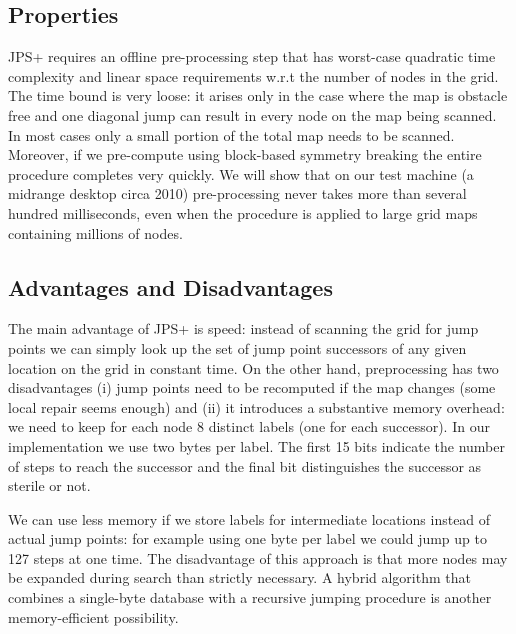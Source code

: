 \subsection*{Properties}
JPS+ requires an offline pre-processing step that has worst-case quadratic 
time complexity and linear space requirements w.r.t the number of nodes in 
the grid. The time bound is very loose: it arises only in the case 
where the map is obstacle free and one diagonal jump can result in
every node on the map being scanned. In most cases only a small portion
of the total map needs to be scanned. Moreover, if we pre-compute using block-based 
symmetry breaking the entire procedure completes very quickly.
We will show that on our test machine (a midrange desktop
circa 2010) pre-processing never takes more than several hundred milliseconds,
even when the procedure is applied to large grid maps containing millions
of nodes.
\subsection*{Advantages and Disadvantages}
The main advantage of JPS+ is speed: instead of scanning the grid for jump
points we can simply look up the set of jump point successors of any given
location on the grid in constant time.  On the other hand, preprocessing has
two disadvantages (i) jump points need to be recomputed if the map changes
(some local repair seems enough) and (ii) it introduces a substantive memory
overhead: we need to keep for each node 8 distinct labels (one for each
successor).  In our implementation we use two bytes per label. The first 15
bits indicate the number of steps to reach the successor and the final bit
distinguishes the successor as sterile or not.
\par
We can use less memory if we store labels for intermediate locations instead
of actual jump points: for example using one byte per label we could jump up
to 127 steps at one time. The disadvantage of this approach is that more nodes
may be expanded during search than strictly necessary. A hybrid algorithm that
combines a single-byte database with a recursive jumping procedure is another
memory-efficient possibility.
